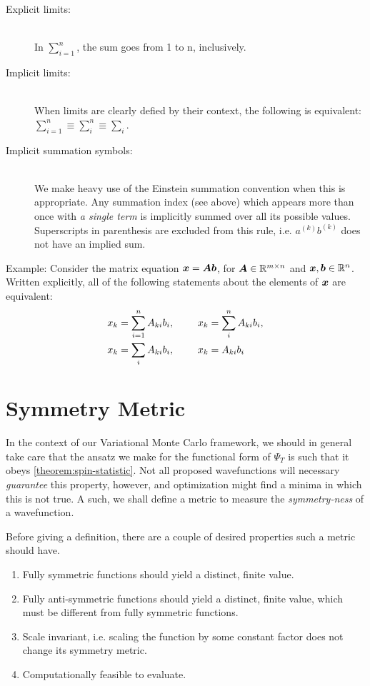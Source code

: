 \documentclass[Thesis.tex]{subfiles}
\begin{document}
\begin{description}
\item[Explicit limits:] \hfill\\
  In $\sum_{i=1}^n$, the sum goes from 1 to n, inclusively.
\item[Implicit limits:]\hfill\\
  When limits are clearly defied by their context, the following is equivalent:
  $\sum_{i=1}^n \equiv \sum_{i}^n\equiv \sum_i$.
\item[Implicit summation symbols:]\hfill\\
  We make heavy use of the Einstein summation convention when this is
  appropriate. Any summation index (see above) which appears more than once with
  \emph{a single term} is implicitly summed over all its possible values.
  Superscripts in parenthesis are excluded from this rule, i.e. $a^{(k)}b^{(k)}$
  does not have an implied sum.
\end{description}

Example: Consider the matrix equation $\bm{x} = \bm{A}\bm{b}$, for
$\bm{A}\in\mathbb{R}^{m\times n}$ and $\bm{x}, \bm{b} \in \mathbb{R}^n$. Written
explicitly, all of the following statements about the elements of $\bm{x}$ are equivalent:
\begin{align}
  \begin{split}
  x_k &= \sum_{i=1}^n A_{ki}b_i,\qq{ } x_k = \sum_{i}^n A_{ki}b_i,\\
  x_k &= \sum_{i} A_{ki}b_i,\qq{ } x_k = A_{ki}b_i
  \end{split}
\end{align}

\section{Symmetry Metric}
\label{app:symmetry-metric}

In the context of our Variational Monte Carlo framework, we should in general
take care that the ansatz we make for the functional form of $\Psi_T$ is such
that it obeys \autoref{theorem:spin-statistic}. Not all proposed wavefunctions
will necessary \emph{guarantee} this property, however, and optimization might
find a minima in which this is not true. A such, we shall define a metric to
measure the \emph{symmetry-ness} of a wavefunction.

Before giving a definition, there are a couple of desired properties such a
metric should have.

\begin{enumerate}
    \item Fully symmetric functions should yield a distinct, finite value.
    \item Fully anti-symmetric functions should yield a distinct, finite value,
        which must be different from fully symmetric functions.
    \item Scale invariant, i.e. scaling the function by
        some constant factor does not change its symmetry metric.
    \item Computationally feasible to evaluate.
\end{enumerate}
\end{document}
